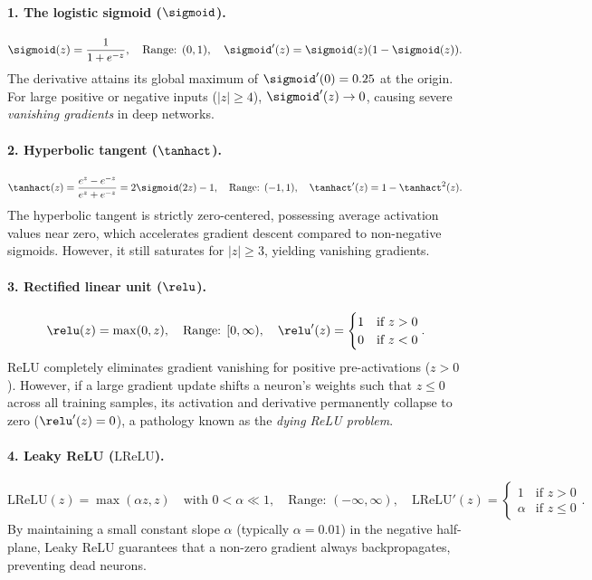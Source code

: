 \documentclass[../../main.tex]{subfiles}
\begin{document}
\paragraph{1. The logistic sigmoid ($\sigmoid$).}
\begin{equation}
\label{eq:sigmoid_def}
\sigmoid(z) = \frac{1}{1 + e^{-z}}, \quad \text{Range: } (0, 1), \quad \sigmoid'(z) = \sigmoid(z)(1 - \sigmoid(z)).
\end{equation}
The derivative attains its global maximum of $\sigmoid'(0) = 0.25$ at the origin. For large positive or negative inputs ($|z| \ge 4$), $\sigmoid'(z) \to 0$, causing severe \emph{vanishing gradients} in deep networks.

\paragraph{2. Hyperbolic tangent ($\tanhact$).}
\begin{equation}
\label{eq:tanh_def}
\tanhact(z) = \frac{e^z - e^{-z}}{e^z + e^{-z}} = 2\sigmoid(2z) - 1, \quad \text{Range: } (-1, 1), \quad \tanhact'(z) = 1 - \tanhact^2(z).
\end{equation}
The hyperbolic tangent is strictly zero-centered, possessing average activation values near zero, which accelerates gradient descent compared to non-negative sigmoids. However, it still saturates for $|z| \ge 3$, yielding vanishing gradients.

\paragraph{3. Rectified linear unit ($\relu$).}
\begin{equation}
\label{eq:relu_def}
\relu(z) = \max(0, z), \quad \text{Range: } [0, \infty), \quad \relu'(z) = \begin{cases} 1 & \text{if } z > 0 \\ 0 & \text{if } z < 0 \end{cases}.
\end{equation}
ReLU completely eliminates gradient vanishing for positive pre-activations ($z > 0$). However, if a large gradient update shifts a neuron's weights such that $z \le 0$ across all training samples, its activation and derivative permanently collapse to zero ($\relu'(z) = 0$), a pathology known as the \emph{dying ReLU problem}.

\paragraph{4. Leaky ReLU ($\text{LReLU}$).}
\begin{equation}
\label{eq:leaky_relu_def}
\text{LReLU}(z) = \max(\alpha z, z) \quad \text{with } 0 < \alpha \ll 1, \quad \text{Range: } (-\infty, \infty), \quad \text{LReLU}'(z) = \begin{cases} 1 & \text{if } z > 0 \\ \alpha & \text{if } z \le 0 \end{cases}.
\end{equation}
By maintaining a small constant slope $\alpha$ (typically $\alpha = 0.01$) in the negative half-plane, Leaky ReLU guarantees that a non-zero gradient always backpropagates, preventing dead neurons.
\end{document}
